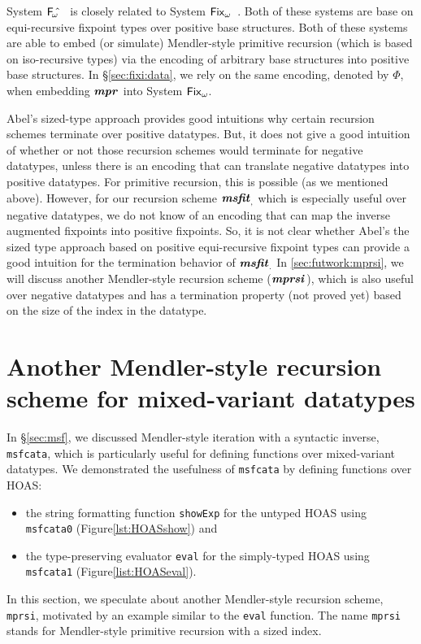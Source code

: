 \documentclass[a4paper,UKenglish]{lipics}
\newcommand{\Fixw}[0]{{\ensuremath{\mathsf{\uppercase{F}\lowercase{ix}}_{\omega}}}}
\newcommand{\Fwhat}[0]{{\ensuremath{\mathsf{\uppercase{F}}_{\!\omega}\!\!\char`\^}}}
\newcommand{\MPr}[1]{\ensuremath{\textbf{\textit{mpr}}_{#1}}}
\newcommand{\MsfIt}[1]{\ensuremath{\textbf{\textit{msfit}}_{#1}}}
\newcommand{\mprsi}[1]{\ensuremath{\textbf{\textit{mprsi}}_{#1}}}
\begin{document}
System \Fwhat\ \cite{abel06phd} is closely related to
System \Fixw\ \cite{AbeMat04}. Both of these systems are base on
equi-recursive fixpoint types over positive base structures.
Both of these systems are able to embed (or simulate) Mendler-style
primitive recursion (which is based on iso-recursive types) via
the encoding \cite{Geu92} of arbitrary base structures into
positive base structures. In \S\ref{sec:fixi:data}, we rely on
the same encoding, denoted by $\Phi$, when embedding \MPr\ into System \Fixw.

Abel's sized-type approach provides good intuitions why 
certain recursion schemes terminate over positive datatypes.
But, it does not give a good intuition of whether or not
those recursion schemes would terminate for negative datatypes,
unless there is an encoding that can translate negative datatypes into
positive datatypes. For primitive recursion, this is possible (as we
mentioned above). However, for our recursion scheme \MsfIt, which is
especially useful over negative datatypes, we do not know of an encoding
that can map the inverse augmented fixpoints into positive fixpoints.
So, it is not clear whether Abel's the sized type approach based on
positive equi-recursive fixpoint types can provide a good intuition
for the termination behavior of \MsfIt.  In \ref{sec:futwork:mprsi},
we will discuss another Mendler-style recursion scheme (\mprsi{}), which
is also useful over negative datatypes and has a termination property
(not proved yet) based on the size of the index in the datatype.




\section{Another Mendler-style recursion scheme for mixed-variant datatypes}
\label{sec:mprsi}

In \S\ref{sec:msf}, we discussed Mendler-style iteration with
a syntactic inverse, \lstinline{msfcata}, which is particularly useful for
defining functions over mixed-variant datatypes.
We demonstrated the usefulness of \lstinline{msfcata} by defining
functions over HOAS:
\begin{itemize}
\item the string formatting function \lstinline{showExp} for
	the untyped HOAS using \lstinline{msfcata0}
	(Figure\;\ref{lst:HOASshow}) and
\item the type-preserving evaluator \lstinline{eval} for
	the simply-typed HOAS using \lstinline{msfcata1}
	(Figure\;\ref{list:HOASeval}).
\end{itemize}
In this section, we speculate about another Mendler-style recursion scheme,
\lstinline{mprsi}, motivated by an example similar to the \lstinline{eval}
function. The name \lstinline{mprsi} stands for
Mendler-style primitive recursion with a sized index.
\end{document}
